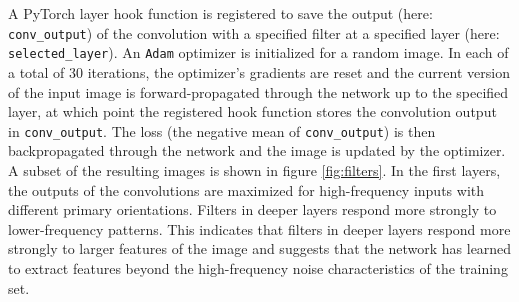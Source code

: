 \documentclass[a4paper]{article}
\begin{document}
A PyTorch layer hook function is registered to save the output (here: \texttt{conv\_output}) of the convolution with a specified filter at a specified layer (here: \texttt{selected\_layer}). An \texttt{Adam} optimizer \cite{Kingma2014} is initialized for a random image. In each of a total of 30 iterations, the optimizer's gradients are reset and the current version of the input image is forward-propagated through the network up to the specified layer, at which point the registered hook function stores the convolution output in \texttt{conv\_output}. The loss (the negative mean of \texttt{conv\_output}) is then backpropagated through the network and the image is updated by the optimizer.\\
A subset of the resulting images is shown in figure \ref{fig:filters}. In the first layers, the outputs of the convolutions are maximized for high-frequency inputs with different primary orientations. Filters in deeper layers respond more strongly to lower-frequency patterns. This indicates that filters in deeper layers respond more strongly to larger features of the image and suggests that the network has learned to extract features beyond the high-frequency noise characteristics of the training set.
\end{document}
